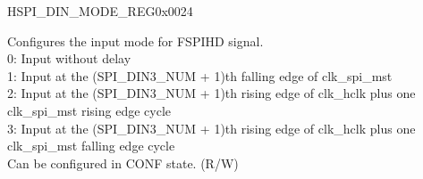 \begin{register}{H}{SPI\_DIN\_MODE\_REG}{0x0024}
\begin{regdesc}
\begin{reglist}
\label{fielddesc:SPIDIN3MODE}\item [SPI\_DIN3\_MODE] Configures the input mode for FSPIHD signal.\\
0: Input without delay\\
1: Input at the (SPI\_DIN3\_NUM + 1)th falling edge of clk\_spi\_mst\\
2: Input at the (SPI\_DIN3\_NUM + 1)th rising edge of clk\_hclk plus one clk\_spi\_mst rising edge cycle\\
3: Input at the (SPI\_DIN3\_NUM + 1)th rising edge of clk\_hclk plus one clk\_spi\_mst falling edge cycle\\
Can be configured in CONF state. (R/W)

\item [Continued on the next page...]
\end{reglist}\end{regdesc}
\end{register}

